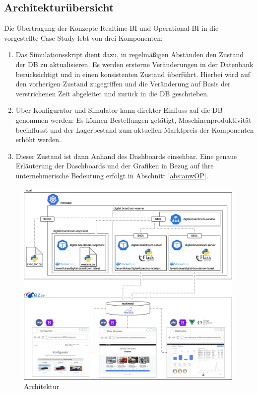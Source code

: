 \subsection{Architekturübersicht}
Die Übertragung der Konzepte Realtime-\ac{BI} und Operational-\ac{BI} in die vorgestellte Case Study lebt von drei Komponenten: 
\begin{enumerate}
    \item Das Simulationsskript dient dazu, in regelmäßigen Abständen den Zustand der \ac{DB} zu aktualisieren. Es werden ersterne Veränderungen in der Datenbank berücksichtigt und in einen konsistenten Zustand überführt. Hierbei wird auf den vorherigen Zustand zugegriffen und die Veränderung auf Basis der verstrichenen Zeit abgeleitet und zurück in die \ac{DB} geschrieben.
    \item Über Konfigurator und Simulator kann direkter Einfluss auf die \ac{DB} genommen werden: Es können Bestellungen getätigt, Maschinenproduktivität beeinflusst und der Lagerbestand zum aktuellen Marktpreis der Komponenten erhöht werden.
    \item Dieser Zustand ist dann Anhand des Dashboards einsehbar. Eine genaue Erläuterung der Daschboards und der Grafiken in Bezug auf ihre unternehmerische Bedeutung erfolgt in Abschnitt \ref{abs:anwOP}.
\end{enumerate}
\begin{figure}[h]
    \centering
    \includegraphics[width=0.99\textwidth]{ausarbeitung-latex/img/Architektur-Vertikal.png}
    \caption{Architektur}
    \label{fig:arch}
\end{figure}
